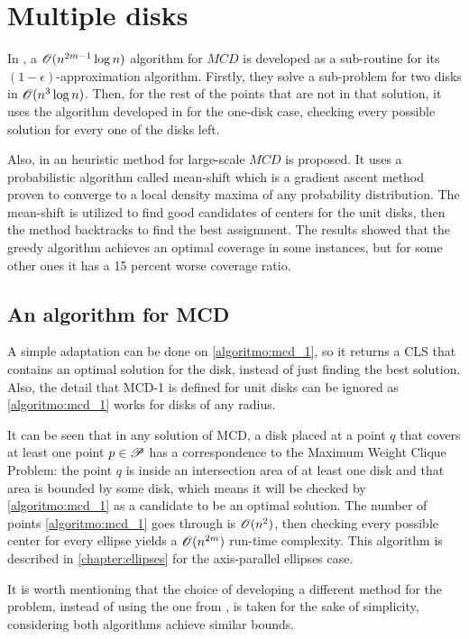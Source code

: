 \section{Multiple disks}


In , a $\mathscr{O}(n^{2m-1}\log{n})$ algorithm for $MCD$ is developed as a sub-routine for its $(1-\epsilon)$-approximation algorithm. Firstly, they solve a sub-problem for two disks in $\mathscr{O}(n^3\log{n})$. Then, for the rest of the points that are not in that solution, it uses the algorithm developed in  for the one-disk case, checking every possible solution for every one of the disks left.

Also, in  an heuristic method for large-scale $MCD$ is proposed. It uses a probabilistic algorithm called mean-shift which is a gradient ascent method proven to converge to a local density maxima of any probability distribution. The mean-shift is utilized to find good candidates of centers for the unit disks, then the method backtracks to find the best assignment. The results showed that the greedy algorithm achieves an optimal coverage in some instances, but for some other ones it has a 15 percent worse coverage ratio.

\subsection{An algorithm for MCD}

A simple adaptation can be done on \autoref{algoritmo:mcd_1}, so it returns a CLS that contains an optimal solution for the disk, instead of just finding the best solution. Also, the detail that MCD-1 is defined for unit disks can be ignored as \autoref{algoritmo:mcd_1} works for disks of any radius.

It can be seen that in any solution of MCD, a disk placed at a point $q$ that covers at least one point $p \in \mathscr{P}$ has a correspondence to the Maximum Weight Clique Problem: the point $q$ is inside an intersection area of at least one disk and that area is bounded by some disk, which means it will be checked by \autoref{algoritmo:mcd_1} as a candidate to be an optimal solution. The number of points \autoref{algoritmo:mcd_1} goes through is $\mathscr{O}(n^2)$, then checking every possible center for every ellipse yields a $\mathscr{O}(n^{2m})$ run-time complexity.
This algorithm is described in \autoref{chapter:ellipses} for the axis-parallel ellipses case.

It is worth mentioning that the choice of developing a different method for the problem, instead of using the one from , is taken for the sake of simplicity, considering both algorithms achieve similar bounds.